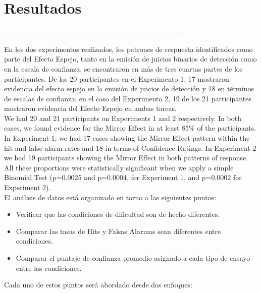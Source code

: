 
\chapter{Resultados} %

\label{Cap_Res} %

----------------------------------------------------------------------------

En los dos experimentos realizados, los patrones de respuesta identificados como parte del Efecto Espejo, tanto en la emisión de juicios binarios de detección como en la escala de confianza, se encontraron en más de tres cuartas partes de los participantes. De los 20 participantes en el Experimento 1, 17 mostraron evidencia del efecto espejo en la emisión de juicios de detección y 18 en términos de escalas de confianza; en el caso del Experimento 2, 19 de los 21 participantes mostraron evidencia del Efecto Espejo en ambas tareas.\\


We had 20 and 21 participants on Experiments 1 and 2 respectively. In both cases, we found evidence for the Mirror Effect in at least 85\% of the participants. In Experiment 1, we had 17 cases showing the Mirror Effect pattern within the hit and false alarm rates and 18 in terms of Confidence Ratings. In Experiment 2 we had 19 participants showing the Mirror Effect in both patterns of response. All these proportions were statistically significant when we apply a simple Binomial Test (p=0.0025 and p=0.0004, for Experiment 1, and p=0.0002 for Experiment 2).\\

El análisis de datos está organizado en torno a las siguientes puntos:\\

\begin{itemize}
\item Verificar que las condiciones de dificultad son de hecho diferentes.
\item Comparar las tasas de Hits y Falsas Alarmas sean diferentes entre condiciones.
\item Comparar el puntaje de confianza promedio asignado a cada tipo de ensayo entre las condiciones.
\end{itemize}

Cada uno de estos puntos será abordado desde dos enfoques:\\


